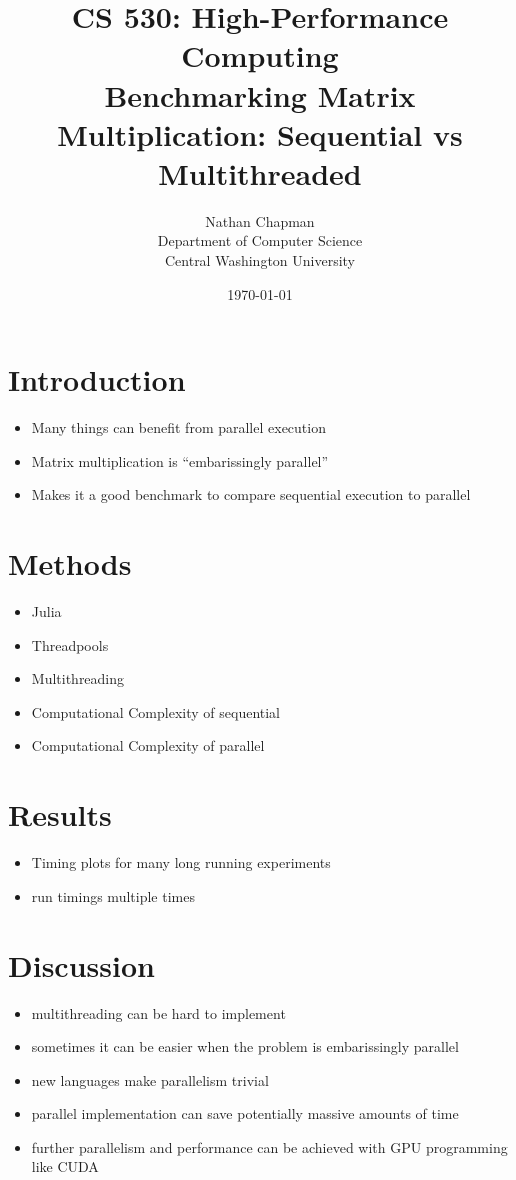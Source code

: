 \documentclass{article}
\title{\Large \vspace{-0.5in} CS 530: High-Performance Computing \\ Benchmarking Matrix Multiplication: Sequential vs Multithreaded \vspace{-0.25in}}
\author{Nathan Chapman \vspace{-0.05in} \\ \normalsize Department of Computer Science \vspace{-0.15in} \\ \normalsize Central Washington University}
\date{\normalsize \vspace{-0.15in}\today}
\begin{document}
\maketitle
\tableofcontents

\pagebreak

\section{Introduction}

    \begin{itemize}
        \item Many things can benefit from parallel execution
        \item Matrix multiplication is ``embarissingly parallel''
        \item Makes it a good benchmark to compare sequential execution to parallel
    \end{itemize}

\section{Methods}

    \begin{itemize}
        \item Julia
        \item Threadpools
        \item Multithreading
        \item Computational Complexity of sequential
        \item Computational Complexity of parallel
    \end{itemize}

\section{Results}

    \begin{itemize}
        \item Timing plots for many long running experiments
        \item run timings multiple times
    \end{itemize}

\section{Discussion}

    \begin{itemize}
        \item multithreading can be hard to implement
        \item sometimes it can be easier when the problem is embarissingly parallel
        \item new languages make parallelism trivial
        \item parallel implementation can save potentially massive amounts of time
        \item further parallelism and performance can be achieved with GPU programming like CUDA
    \end{itemize}
\end{document}
